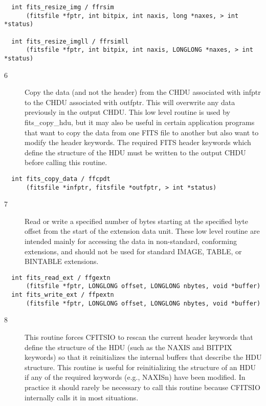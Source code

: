 \documentclass[11pt]{book}
\begin{document}
\begin{verbatim}
  int fits_resize_img / ffrsim
      (fitsfile *fptr, int bitpix, int naxis, long *naxes, > int *status)

  int fits_resize_imgll / ffrsimll
      (fitsfile *fptr, int bitpix, int naxis, LONGLONG *naxes, > int *status)
\end{verbatim}

\begin{description}
\item[6 ] Copy the data (and not the header) from the CHDU associated with infptr
    to the CHDU associated with outfptr. This will overwrite any data
    previously in the output CHDU.  This low level routine is used by
    fits\_copy\_hdu, but it may also be useful in certain application programs
    that want to copy the data from one FITS file to another but also
    want to modify the header keywords. The required FITS header keywords
    which define the structure of the HDU must be written to the
   output CHDU before calling this routine. \label{ffcpdt}
\end{description}

\begin{verbatim}
  int fits_copy_data / ffcpdt
      (fitsfile *infptr, fitsfile *outfptr, > int *status)
\end{verbatim}

\begin{description}
\item[7 ] Read or write a specified number of bytes starting at the specified byte
    offset from the start of the extension data unit.  These low
    level routine are intended mainly for accessing the data in
    non-standard, conforming extensions, and should not be used for standard
   IMAGE, TABLE, or BINTABLE extensions. \label{ffgextn}
\end{description}

\begin{verbatim}
  int fits_read_ext / ffgextn
      (fitsfile *fptr, LONGLONG offset, LONGLONG nbytes, void *buffer)
  int fits_write_ext / ffpextn
      (fitsfile *fptr, LONGLONG offset, LONGLONG nbytes, void *buffer)
\end{verbatim}

\begin{description}
\item[8 ] This routine forces CFITSIO to rescan the current header keywords that
    define the structure of the HDU (such as the NAXIS and BITPIX
    keywords) so that it reinitializes the internal buffers that
    describe the HDU structure.  This routine is useful for
    reinitializing the structure of an HDU if any of the required
    keywords (e.g., NAXISn) have been modified.  In practice it should
    rarely be necessary to call this routine because CFITSIO
   internally calls it in most situations. \label{ffrdef}
\end{description}
\end{document}
